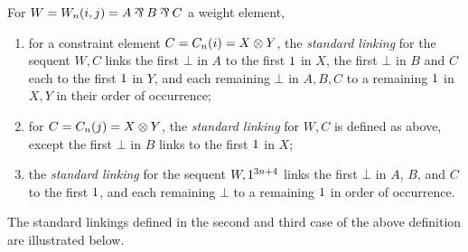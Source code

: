 \documentclass{sigplanconf-modified}
\begin{document}
                                                                                                                                                                                                                                                                                                                                                                                                                                                                                  
\begin{definition}
\label{def:standard linkings}
For $W=W_n(i,j)=A\parr B\parr C$ a weight element,
\begin{enumerate}
	\item
for a constraint element $C=C_n(i)=X\otimes Y$, the \emph{standard linking} for the sequent $W,C$ links the first $\bot$ in $A$ to the first $1$ in $X$, the first $\bot$ in $B$ and $C$ each to the first $1$ in $Y$, and each remaining $\bot$ in $A,B,C$ to a remaining $1$ in $X,Y$ in their order of occurrence;
	\item
for $C=C_n(j)=X\otimes Y$, the \emph{standard linking} for $W,C$ is defined as above, except the first $\bot$ in $B$ links to the first $1$ in $X$;
	\item
the \emph{standard linking} for the sequent $W,1^{3n+4}$ links the first $\bot$ in $A$, $B$, and $C$ to the first $1$, and each remaining $\bot$ to a remaining $1$ in order of occurrence.
\end{enumerate}
\end{definition}

The standard linkings defined in the \color{red} second \color{black} and third case of the above definition are illustrated below.
\end{document}

